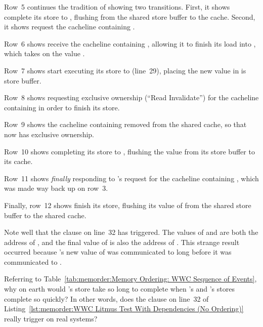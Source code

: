 Row~5 continues the tradition of showing two transitions.
First, it shows  complete its store to , flushing
from the shared store buffer to the cache.
Second, it shows  request the cacheline containing .

Row~6 shows  receive the cacheline containing , allowing
it to finish its load into , which takes on the value .

Row~7 shows  start executing its store to  (line~29), placing the
new value in is store buffer.

Row~8 shows  requesting exclusive ownership (``Read Invalidate'')
for the cacheline containing  in order to finish its store.

Row~9 shows the cacheline containing  removed from the shared cache,
so that  now has exclusive ownership.

Row~10 shows  completing its store to , flushing the value
from its store buffer to its cache.

Row~11 shows  \emph{finally} responding to 's request for
the cacheline containing , which was made way back up on row~3.

Finally, row~12 shows  finish its store, flushing its value of
 from the shared store buffer to the shared cache.

Note well that the  clause on line~32 has triggered.
The values of  and  are both the address of , and
the final value of  is also the address of .
This strange result occurred because 's new value of  was
communicated to  long before it was communicated to .

\QuickQuiz{}
	Referring to
	Table~\ref{tab:memorder:Memory Ordering: WWC Sequence of Events},
	why on earth would 's store take so long to complete when
	's and 's stores complete so quickly?
	In other words, does the  clause on line~32 of
	Listing~\ref{lst:memorder:WWC Litmus Test With Dependencies (No Ordering)}
	really trigger on real systems?
 \QuickQuizEnd

